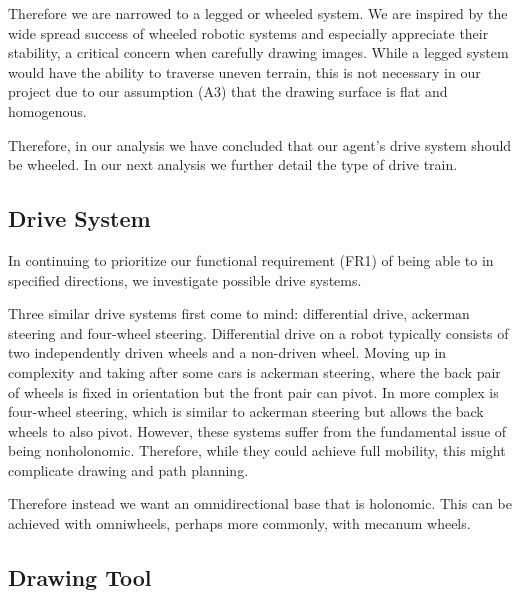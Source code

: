 Therefore we are narrowed to a legged or wheeled system.  We are inspired by the wide spread success of wheeled robotic systems and especially appreciate their stability, a critical concern when carefully drawing images. While a legged system would have the ability to traverse uneven terrain, this is not necessary in our project due to our assumption (A3) that the drawing surface is flat and homogenous. 

Therefore, in our analysis we have concluded that our agent's drive system should be wheeled. In our next analysis we further detail the type of drive train. 

\subsection{Drive System}
\label{sec:trade_drive}
In continuing to prioritize our functional requirement (FR1) of being able to in specified directions, we investigate possible drive systems. 

Three similar drive systems first come to mind: differential drive, ackerman steering and four-wheel steering. Differential drive on a robot typically consists of two independently driven wheels and a non-driven wheel. Moving up in complexity and taking after some cars is ackerman steering, where the back pair of wheels is fixed in orientation but the front pair can pivot. In more complex is four-wheel steering, which is similar to ackerman steering but allows the back wheels to also pivot. However, these systems suffer from the fundamental issue of being nonholonomic. Therefore, while they could achieve full mobility, this might complicate drawing and path planning. 

Therefore instead we want an omnidirectional base that is holonomic. This can be achieved with omniwheels, perhaps more commonly, with mecanum wheels. 

\subsection{Drawing Tool}

